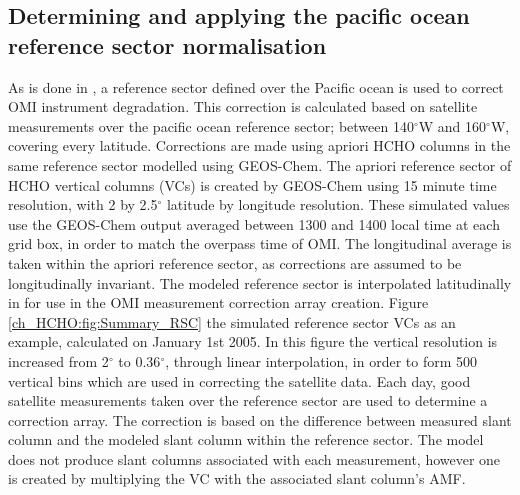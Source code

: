   \subsection{Determining and applying the pacific ocean reference sector normalisation}
    \label{ch_HCHO:sec:RSC}

    As is done in \citet{Abad2015}, a reference sector defined over the Pacific ocean is used to correct OMI instrument degradation.
    This correction is calculated based on satellite measurements over the pacific ocean reference sector; between 140$^{\circ}$W and 160$^{\circ}$W, covering every latitude.
    Corrections are made using apriori HCHO columns in the same reference sector modelled using GEOS-Chem.
    The apriori reference sector of HCHO vertical columns (VCs) is created by GEOS-Chem using 15 minute time resolution, with 2 by 2.5$^{\circ}$ latitude by longitude resolution.
    These simulated values use the GEOS-Chem output averaged between 1300 and 1400 local time at each grid box, in order to match the overpass time of OMI.
    The longitudinal average is taken within the apriori reference sector, as corrections are assumed to be longitudinally invariant.
    The modeled reference sector is interpolated latitudinally in for use in the OMI measurement correction array creation.
    Figure \ref{ch_HCHO:fig:Summary_RSC} the simulated reference sector VCs as an example, calculated on January 1st 2005.
    In this figure the vertical resolution is increased from 2$^{\circ}$ to 0.36$^{\circ}$, through linear interpolation, in order to form 500 vertical bins which are used in correcting the satellite data.
    Each day, good satellite measurements taken over the reference sector are used to determine a correction array.
    The correction is based on the difference between measured slant column and the modeled slant column within the reference sector.
    The model does not produce slant columns associated with each measurement, however one is created by multiplying the VC with the associated slant column's AMF.
    

